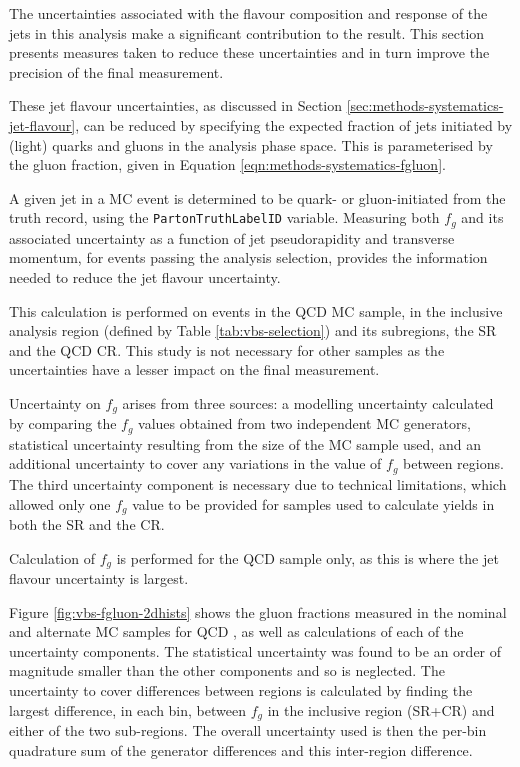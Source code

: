 \newcommand\fgluon{$f_g$\xspace}

The uncertainties associated with the flavour composition and response of the
jets in this analysis make a significant contribution to the result. This
section presents measures taken to reduce these uncertainties and in turn
improve the precision of the final measurement.

These jet flavour uncertainties, as discussed in Section
\ref{sec:methods-systematics-jet-flavour}, can be reduced by specifying the
expected fraction of jets initiated by (light) quarks and gluons in the analysis phase
space. This is parameterised by the gluon fraction, given in Equation
\ref{eqn:methods-systematics-fgluon}.

A given jet in a \ac{MC} event is determined to be quark- or gluon-initiated
from the truth record, using the \verb|PartonTruthLabelID| variable.  Measuring
both \fgluon and its associated uncertainty as a function of jet pseudorapidity
and transverse momentum, for events passing the analysis selection, provides the
information needed to reduce the jet flavour uncertainty.

This calculation is performed on events in the \ac{QCD} \Zy \ac{MC} sample, in
the inclusive analysis region (defined by Table \ref{tab:vbs-selection}) and its
subregions, the \ac{SR} and the \ac{QCD} \ac{CR}. This study is not necessary
for other samples as the uncertainties have a lesser impact on the final
measurement.

Uncertainty on \fgluon arises from three sources: a modelling uncertainty
calculated by comparing the \fgluon values obtained from two independent \ac{MC}
generators, statistical uncertainty resulting from the size of the \ac{MC}
sample used, and an additional uncertainty to cover any variations in the value
of \fgluon between regions. The third uncertainty component is necessary due to
technical limitations, which allowed only one \fgluon value to be provided for
samples used to calculate yields in both the \ac{SR} and the \ac{CR}.

Calculation of \fgluon is performed for the \ac{QCD} \Zy sample only, as this is
where the jet flavour uncertainty is largest.

Figure \ref{fig:vbs-fgluon-2dhists} shows the gluon fractions measured in the
nominal and alternate \ac{MC} samples for \ac{QCD} \Zy, as well as calculations
of each of the uncertainty components.  The statistical uncertainty was found to
be an order of magnitude smaller than the other components and so is neglected.
The uncertainty to cover differences between regions is calculated by finding
the largest difference, in each bin, between \fgluon in the inclusive region
(\ac{SR}+\ac{CR}) and either of the two sub-regions. The overall uncertainty
used is then the per-bin quadrature sum of the generator differences and this
inter-region difference.


